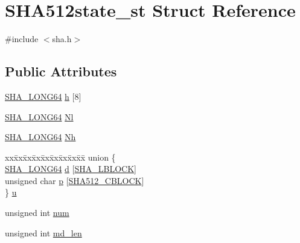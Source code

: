\hypertarget{struct_s_h_a512state__st}{}\section{S\+H\+A512state\+\_\+st Struct Reference}
\label{struct_s_h_a512state__st}


{\ttfamily \#include $<$sha.\+h$>$}

\subsection*{Public Attributes}
\begin{DoxyCompactItemize}
\item 
\hyperlink{sha_8h_a26681fbb750476e9b7532b8744916024}{S\+H\+A\+\_\+\+L\+O\+N\+G64} \hyperlink{struct_s_h_a512state__st_a883844a48a6badf07ab8d5a3b42fa0f6}{h} \mbox{[}8\mbox{]}
\item 
\hyperlink{sha_8h_a26681fbb750476e9b7532b8744916024}{S\+H\+A\+\_\+\+L\+O\+N\+G64} \hyperlink{struct_s_h_a512state__st_a8adc6d1037d156b3adcb14773fa8fe90}{Nl}
\item 
\hyperlink{sha_8h_a26681fbb750476e9b7532b8744916024}{S\+H\+A\+\_\+\+L\+O\+N\+G64} \hyperlink{struct_s_h_a512state__st_acfe2405c1f495e7fe24c837ef4a7a9e1}{Nh}
\item 
\begin{tabbing}
xx\=xx\=xx\=xx\=xx\=xx\=xx\=xx\=xx\=\kill
union \{\\
\>\hyperlink{sha_8h_a26681fbb750476e9b7532b8744916024}{SHA\_LONG64} \hyperlink{struct_s_h_a512state__st_ae6c768e7fafbc106b26f2dcd02ec9cf5}{d} \mbox{[}\hyperlink{sha_8h_a8902af97bc4411166213b43c6d2057d2}{SHA\_LBLOCK}\mbox{]}\\
\>unsigned char \hyperlink{struct_s_h_a512state__st_ac374088935867ed28c9210a4ce44e754}{p} \mbox{[}\hyperlink{sha_8h_a322ff23dfbf746e0864f4e81786141b6}{SHA512\_CBLOCK}\mbox{]}\\
\} \hyperlink{struct_s_h_a512state__st_aa4c28febb7375750361c9494620ba773}{u}\\

\end{tabbing}\item 
unsigned int \hyperlink{struct_s_h_a512state__st_ae3ba23906ed2416ed3fae1765cf3c0f0}{num}
\item 
unsigned int \hyperlink{struct_s_h_a512state__st_ac2699bd40af3279042712d23b79fb3db}{md\+\_\+len}
\end{DoxyCompactItemize}


